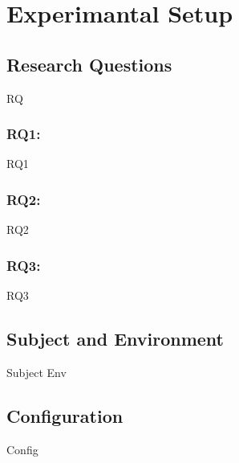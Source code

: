 \section{Experimantal Setup}
\label{sec:setup}

\subsection{Research Questions}
\label{sec:rq}
RQ

\subsubsection{RQ1: }
\label{sec:rq1}
RQ1

\subsubsection{RQ2: }
\label{sec:rq2}
RQ2

\subsubsection{RQ3: }
\label{sec:rq3}
RQ3

\subsection{Subject and Environment}
\label{sec:subject}
Subject
Env

\subsection{Configuration}
\label{sec:configuration}
Config
